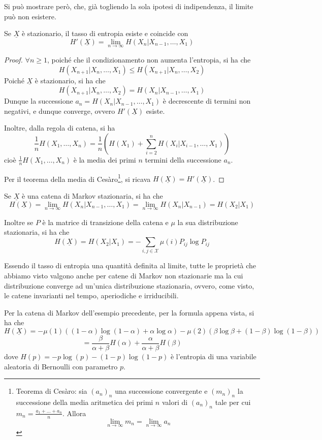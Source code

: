 Si può mostrare però, che, già togliendo la sola ipotesi di indipendenza, il limite può non esistere.

\begin{theorem}{}
  Se \(\underline{X}\) è stazionario, il tasso di entropia esiste e coincide con
  \[H'(\underline{X}) = \lim_{n\to\infty} H(X_n|X_{n-1}, \ldots, X_1)\]
\end{theorem}

\begin{proof}
  \(\forall n \geq 1\), poiché che il condizionamento non aumenta l'entropia, si ha che
  \[H(X_{n+1}|X_n, \ldots, X_1)\leq H(X_{n+1}|X_n, \ldots, X_2)\]
  Poiché \(\underline{X}\) è stazionario, si ha che
  \[H(X_{n+1}|X_n, \ldots, X_2) = H(X_n|X_{n-1}, \ldots, X_1)\]
  Dunque la successione \(a_n = H(X_n|X_{n-1}, \ldots, X_1)\) è decrescente di termini non negativi, e dunque converge, ovvero \(H'(\underline{X})\) esiste.

  Inoltre, dalla regola di catena, si ha 
  \[\frac{1}{n} H(X_1, \ldots, X_n) = \frac{1}{n}\left(H(X_1) +\sum_{i=2}^n H(X_i|X_{i-1}, \ldots, X_1)\right)\]
  cioè \(\frac{1}{n} H(X_1, \ldots, X_n)\) è la media dei primi \(n\) termini della successione \(a_n\).

  Per il teorema della media di Cesàro\footnote{Teorema di Cesàro: sia $(a_{n})_{n}$ una successione convergente e $(m_{n})_{n}$ la successione della media aritmetica dei primi $n$ valori di $(a_{n})_{n}$ tale per cui $m_{n}=\frac{a_{1}+\dots +a_{n}}{n}$. Allora$$\lim_{ n \to \infty }{m_{n}}=\lim_{ n \to \infty }{a_{n}}$$}, si ricava \(H(\underline{X}) = H'(\underline{X})\).
\end{proof}

Se \(\underline{X}\) è una catena di Markov stazionaria, si ha che
\[H(\underline{X}) = \lim_{n\to\infty}H(X_n|X_{n-1}, \ldots, X_1) = \lim_{n\to\infty} H(X_n|X_{n-1}) = H(X_2|X_1)\]

Inoltre se \(P\) è la matrice di transizione della catena e \(\mu\) la sua distribuzione stazionaria, si ha che
\[H(\underline{X}) = H(X_2|X_1) = -\sum_{i,j\in \mathcal{X}} \mu(i) P_{ij} \log P_{ij}\]

Essendo il tasso di entropia una quantità definita al limite, tutte le proprietà che abbiamo visto valgono anche per catene di Markov non stazionarie ma la cui distribuzione converge ad un'unica distribuzione stazionaria, ovvero, come visto, le catene invarianti nel tempo, aperiodiche e irriducibili.

\begin{example}{}
  Per la catena di Markov dell'esempio precedente, per la formula appena vista, si ha che
  \[H(\underline{X}) = -\mu(1)\left((1-\alpha)\log(1-\alpha) + \alpha \log \alpha\right) - \mu(2)\left(\beta \log \beta + (1-\beta) \log (1-\beta)\right)\]
  \[=\frac{\beta}{\alpha+\beta} H(\alpha) + \frac{\alpha}{\alpha+\beta} H(\beta)\]
  dove \(H(p) = -p \log(p) - (1-p) \log (1-p)\) è l'entropia di una variabile aleatoria di Bernoulli con parametro \(p\).
\end{example}



